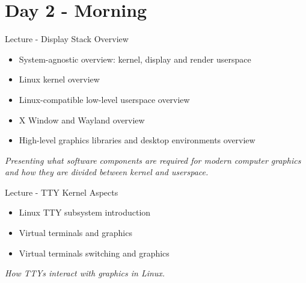 \documentclass[a4paper,12pt,obeyspaces,spaces,hyphens]{article}
\begin{document}
\section{Day 2 - Morning}

\feagendatwocolumn
{Lecture - Display Stack Overview}
{
  \begin{itemize}
  \item System-agnostic overview: kernel, display and render userspace
  \item Linux kernel overview
  \item Linux-compatible low-level userspace overview
  \item X Window and Wayland overview
  \item High-level graphics libraries and desktop environments overview
  \end{itemize}
  \vspace{0.5em}
  {\em Presenting what software components are required for modern computer graphics and how they are divided between kernel and userspace.}
}
{Lecture - TTY Kernel Aspects}
{
  \begin{itemize}
  \item Linux TTY subsystem introduction
  \item Virtual terminals and graphics
  \item Virtual terminals switching and graphics
  \end{itemize}
  \vspace{0.5em}
  {\em How TTYs interact with graphics in Linux.}
}
\\
\end{document}
